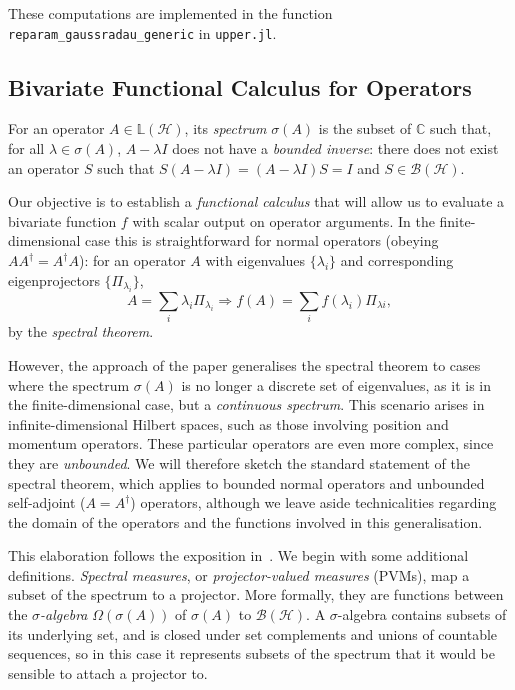 \documentclass[10pt, a4paper]{article}
\numberwithin{equation}{section} %
\theoremstyle{definition}
\theoremstyle{plain}
\newcommand{\?}{\mathrel{?}} %
\newcommand{\C}{\mathbb{C}} %
\newcommand{\Lin}[1]{\mathbb{L}\left(#1\right)}
\newcommand{\Hs}{\mathcal{H}} %
\begin{document}
\begin{appendices}
                    These computations are implemented in the function \verb`reparam_gaussradau_generic` in \verb`upper.jl`. 

                    \subsection{Bivariate Functional Calculus for Operators}

                    For an operator \(A \in \Lin{\Hs}\), its \emph{spectrum} \(\sigma(A)\) is the subset of \(\C\) such that, for all \(\lambda \in \sigma(A)\), \(A - \lambda I\) does not have a \emph{bounded inverse}: there does not exist an operator \(S\) such that \(S\left( A - \lambda I \right) = \left( A - \lambda I \right)S =  I\) and \(S \in \mathcal{B}(\Hs)\).

                    Our objective is to establish a \emph{functional calculus} that will allow us to evaluate a bivariate function  \(f\) with scalar output on operator arguments. In the finite-dimensional case this is straightforward for normal operators (obeying \(AA^{\dagger} = A^{\dagger}A\)): for an operator \(A\) with eigenvalues \(\{\lambda_i\}\) and corresponding eigenprojectors \(\{\Pi_{\lambda_i}\}\),
                    \[ A = \sum_i \lambda_i \Pi_{\lambda_i} \Rightarrow f(A) = \sum_i f(\lambda_{i}) \Pi_{\lambda{i}}, \]
                    by the \emph{spectral theorem}.

                    However, the approach of the paper generalises the spectral theorem to cases where the spectrum \(\sigma(A)\) is no longer a discrete set of eigenvalues, as it is in the finite-dimensional case, but a \emph{continuous spectrum}. This scenario arises in infinite-dimensional Hilbert spaces, such as those involving position and momentum operators. These particular operators are even more complex, since they are \emph{unbounded}. We will therefore sketch the standard statement of the spectral theorem, which applies to bounded normal operators and unbounded self-adjoint (\(A = A^{\dagger}\)) operators, although we leave aside technicalities regarding the domain of the operators and the functions involved in this generalisation.

                    This elaboration follows the exposition in~\cite{HallQuantumForMath}. We begin with some additional definitions. \emph{Spectral measures}, or \emph{projector-valued measures} (PVMs), map a subset of the spectrum to a projector. More formally, they are functions between the \emph{\(\sigma\)-algebra} \(\Omega(\sigma(A))\) of \(\sigma(A)\) to \(\mathcal{B}(\Hs)\). A \(\sigma\)-algebra contains subsets of its underlying set, and is closed under set complements and unions of countable sequences, so in this case it represents subsets of the spectrum that it would be sensible to attach a projector to.


\end{appendices}
\end{document}
